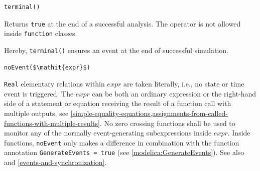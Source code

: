 \begin{operatordefinition}[terminal]
\begin{synopsis}\begin{lstlisting}
terminal()
\end{lstlisting}\end{synopsis}
\begin{semantics}
Returns \lstinline!true! at the end of a successful analysis.
The operator is not allowed inside \lstinline!function! classes.
\begin{nonnormative}
Hereby, \lstinline!terminal()! ensures an event at the end of successful simulation.
\end{nonnormative}
\end{semantics}
\end{operatordefinition}

\begin{operatordefinition}[noEvent]
\begin{synopsis}\begin{lstlisting}
noEvent($\mathit{expr}$)
\end{lstlisting}\end{synopsis}
\begin{semantics}
\lstinline!Real! elementary relations within $\mathit{expr}$ are taken literally, i.e., no state or time event is triggered.
The $\mathit{expr}$ can be both an ordinary expression or the right-hand side of a statement or equation receiving the result of a function call with multiple outputs, see \cref{simple-equality-equations,assignments-from-called-functions-with-multiple-results}.
No zero crossing functions shall be used to monitor any of the normally event-generating subexpressions inside $\mathit{expr}$.
Inside functions, \lstinline!noEvent! only makes a difference in combination with the function annotation \lstinline!GenerateEvents = true! (see \cref{modelica:GenerateEvents}).
See also  and \cref{events-and-synchronization}.
\end{semantics}
\end{operatordefinition}

